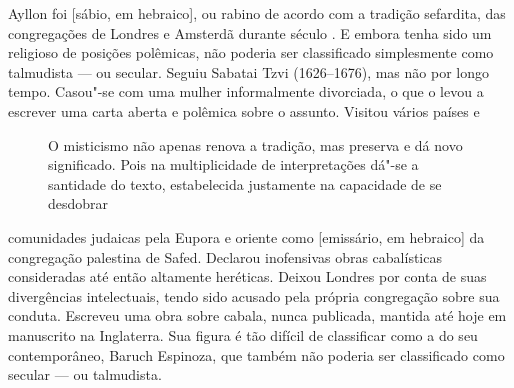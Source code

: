 \pagebreak

\vspace*{1.5cm}


\bigskip

\hfill{}

\bigskip
\bigskip
\bigskip

\begin{multicols}{2}
Ayllon foi {} [sábio, em hebraico], ou rabino de acordo com a tradição sefardita, das congregações de Londres e Amsterdã durante século . E embora tenha sido um religioso de posições polêmicas, não poderia ser classificado simplesmente como talmudista --- ou secular. Seguiu Sabatai Tzvi (1626--1676), mas não por longo tempo. Casou"-se com uma mulher informalmente divorciada, o que o levou a escrever uma carta aberta e polêmica sobre o assunto. Visitou vários países e
\begin{figure}
{\large
O misticismo não apenas renova a tradição, mas preserva e dá novo significado. Pois na multiplicidade de interpretações dá"-se a santidade do texto, estabelecida justamente na capacidade de se desdobrar
}
\end{figure}
comunidades judaicas pela Eupora e oriente como {} [emissário, em hebraico] da congregação palestina de Safed. Declarou inofensivas obras cabalísticas consideradas até então altamente heréticas. Deixou Londres por conta de suas divergências intelectuais, tendo sido acusado pela própria congregação sobre sua conduta. Escreveu uma obra sobre cabala, nunca publicada, mantida até hoje em manuscrito na Inglaterra. Sua figura é tão difícil de classificar como a do seu contemporâneo, Baruch Espinoza, que também não poderia ser classificado como secular --- ou talmudista.


\end{multicols}
